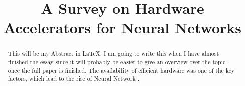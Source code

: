 \documentclass[conference]{IEEEtran}
\begin{document}
\title{A Survey on Hardware Accelerators for Neural Networks}
\author{
}

\maketitle

\begin{abstract}
This will be my Abstract in \LaTeX.
I am going to write this when I have almost finished the essay since it will probably be easier to give an overview over the topic once the full paper is finished.
The availability of efficient hardware was one of the key factors, which lead to the rise of Neural Network \cite{historyfpgas}. 
\\
\end{abstract}
\end{document}
